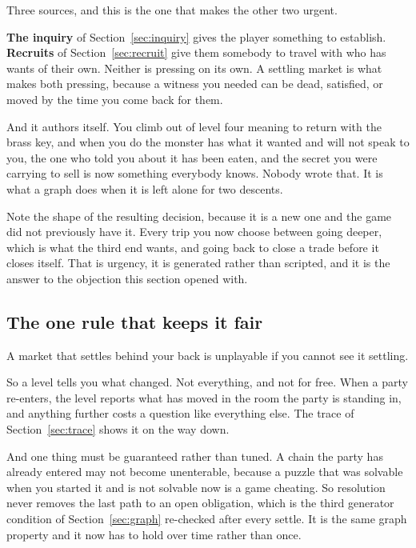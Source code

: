\documentclass[11pt,a4paper]{article}
\begin{document}
Three sources, and this is the one that makes the other two urgent.

\textbf{The inquiry} of Section~\ref{sec:inquiry} gives the player something to establish.
\textbf{Recruits} of Section~\ref{sec:recruit} give them somebody to travel with who has wants of
their own. Neither is pressing on its own. A settling market is what makes both pressing, because
a witness you needed can be dead, satisfied, or moved by the time you come back for them.

\begin{sectionbox}
And it authors itself. You climb out of level four meaning to return with the brass key, and when
you do the monster has what it wanted and will not speak to you, the one who told you about it has
been eaten, and the secret you were carrying to sell is now something everybody knows. Nobody wrote
that. It is what a graph does when it is left alone for two descents.
\end{sectionbox}

Note the shape of the resulting decision, because it is a new one and the game did not previously
have it. Every trip you now choose between going deeper, which is what the third end wants, and
going back to close a trade before it closes itself. That is urgency, it is generated rather than
scripted, and it is the answer to the objection this section opened with.

\subsection{The one rule that keeps it fair}

A market that settles behind your back is unplayable if you cannot see it settling.

So a level tells you what changed. Not everything, and not for free. When a party re-enters, the
level reports what has moved in the room the party is standing in, and anything further costs a
question like everything else. The trace of Section~\ref{sec:trace} shows it on the way down.

\begin{alarmbox}
And one thing must be guaranteed rather than tuned. A chain the party has already entered may not
become unenterable, because a puzzle that was solvable when you started it and is not solvable now
is a game cheating. So resolution never removes the last path to an open obligation, which is the
third generator condition of Section~\ref{sec:graph} re-checked after every settle. It is the same
graph property and it now has to hold over time rather than once.
\end{alarmbox}
\end{document}
